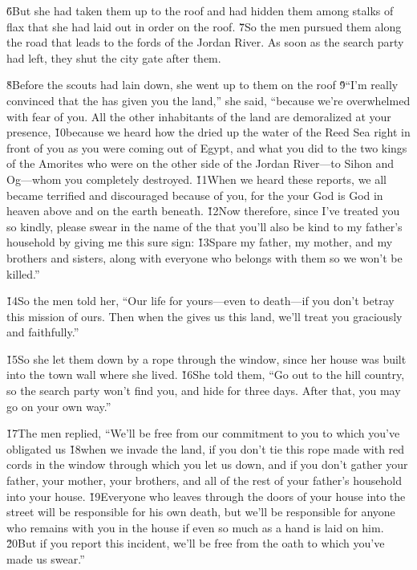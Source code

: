\v{6}But she had taken them up to the roof and had hidden them among stalks of flax that she had laid out in order on the roof. \v{7}So the men pursued them along the road that leads to the fords of the Jordan River. As soon as the search party had left, they shut the city gate after them.

\v{8}Before the scouts had lain down, she went up to them on the roof \v{9}``I'm really convinced that the  has given you the land,'' she said, ``because we're overwhelmed with fear of you. All the other inhabitants of the land are demoralized at your presence, \v{10}because we heard how the  dried up the water of the Reed Sea right in front of you as you were coming out of Egypt, and what you did to the two kings of the Amorites who were on the other side of the Jordan River---to Sihon and Og---whom you completely destroyed. \v{11}When we heard these reports, we all became terrified and discouraged because of you, for the  your God is God in heaven above and on the earth beneath. \v{12}Now therefore, since I've treated you so kindly, please swear in the name of the  that you'll also be kind to my father's household by giving me this sure sign: \v{13}Spare my father, my mother, and my brothers and sisters, along with everyone who belongs with them so we won't be killed.''

\v{14}So the men told her, ``Our life for yours---even to death---if you don't betray this mission of ours. Then when the  gives us this land, we'll treat you graciously and faithfully.''

\v{15}So she let them down by a rope through the window, since her house was built into the town wall where she lived. \v{16}She told them, ``Go out to the hill country, so the search party won't find you, and hide for three days. After that, you may go on your own way.''

\v{17}The men replied, ``We'll be free from our commitment to you to which you've obligated us \v{18}when we invade the land, if you don't tie this rope made with red cords in the window through which you let us down, and if you don't gather your father, your mother, your brothers, and all of the rest of your father's household into your house. \v{19}Everyone who leaves through the doors of your house into the street will be responsible for his own death, but we'll be responsible for anyone who remains with you in the house if even so much as a hand is laid on him. \v{20}But if you report this incident, we'll be free from the oath to which you've made us swear.''

